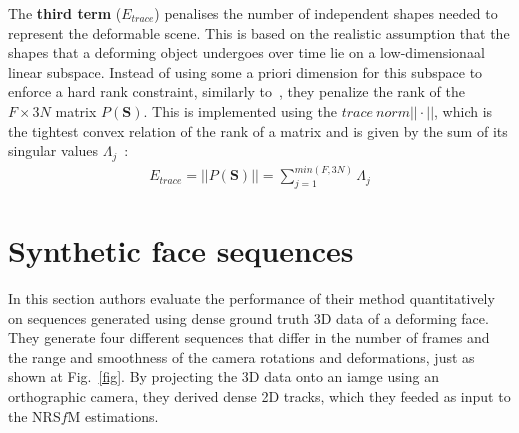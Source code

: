 \documentclass[10pt,twocolumn,letterpaper]{article}
\begin{document}
The {\bf third term} ($E_{trace}$) penalises the number of independent shapes needed to represent the deformable scene. This is based on the realistic assumption that the shapes that a deforming object undergoes over time lie on a low-dimensionaal linear subspace. Instead of using some a priori dimension for this subspace to enforce a hard rank constraint, similarly to~\cite{A}, they penalize the rank of the $F\times 3N$ matrix $P(\mathbf{S})$. This is implemented using the $trace~norm$$||\cdot||$, which is the tightest convex relation of the rank of a matrix and is given by the sum of its singular values $\Lambda_j$~\cite{dense}:\\
\begin{gather}
E_{trace} = ||P(\mathbf{S})|| = \sum_{j=1}^{min(F,3N)}\Lambda_j
\end{gather}

\section{Synthetic face sequences}

In this section authors evaluate the performance of their method quantitatively on sequences generated using dense ground truth 3D data of a deforming face. They generate four different sequences that differ in the number of frames and the range and smoothness of the camera rotations and deformations, just as shown at Fig.~\ref{fig}. By projecting the 3D data onto an iamge using an orthographic camera, they derived dense 2D tracks, which they feeded as input to the NRS$f$M estimations. 


{\small


}
\end{document}
